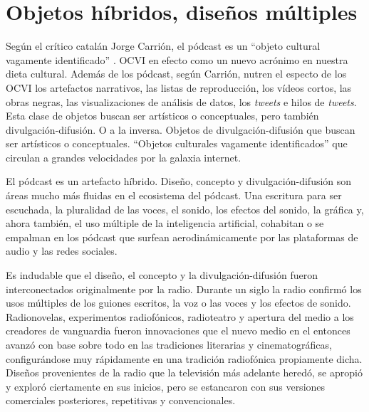 \documentclass[
  spanish,
  11pt,
  a4paper,
]{scrbook}
\begin{document}
\section*{Objetos híbridos, diseños
múltiples}\label{objetos-huxedbridos-diseuxf1os-muxfaltiples}


Según el crítico catalán Jorge Carrión, el pódcast es un ``objeto
cultural vagamente identificado'' \autocite{Carrion2019}. OCVI en efecto
como un nuevo acrónimo en nuestra dieta cultural. Además de los pódcast,
según Carrión, nutren el especto de los OCVI los artefactos narrativos,
las listas de reproducción, los vídeos cortos, las obras negras, las
visualizaciones de análisis de datos, los \emph{tweets} e hilos de
\emph{tweets}. Esta clase de objetos buscan ser artísticos o
conceptuales, pero también divulgación-difusión. O a la inversa. Objetos
de divulgación-difusión que buscan ser artísticos o conceptuales.
``Objetos culturales vagamente identificados'' que circulan a grandes
velocidades por la galaxia internet.

El pódcast es un artefacto híbrido. Diseño, concepto y
divulgación-difusión son áreas mucho más fluidas en el ecosistema del
pódcast. Una escritura para ser escuchada, la pluralidad de las voces,
el sonido, los efectos del sonido, la gráfica y, ahora también, el uso
múltiple de la inteligencia artificial, cohabitan o se empalman en los
pódcast que surfean aerodinámicamente por las plataformas de audio y las
redes sociales.

Es indudable que el diseño, el concepto y la divulgación-difusión fueron
interconectados originalmente por la radio. Durante un siglo la radio
confirmó los usos múltiples de los guiones escritos, la voz o las voces
y los efectos de sonido. Radionovelas, experimentos radiofónicos,
radioteatro y apertura del medio a los creadores de vanguardia
\autocite[18]{Barea2002} fueron innovaciones que el nuevo medio en el
entonces avanzó con base sobre todo en las tradiciones literarias y
cinematográficas, configurándose muy rápidamente en una tradición
radiofónica propiamente dicha. Diseños provenientes de la radio que la
televisión más adelante heredó, se apropió y exploró ciertamente en sus
inicios, pero se estancaron con sus versiones comerciales posteriores,
repetitivas y convencionales.
\end{document}

